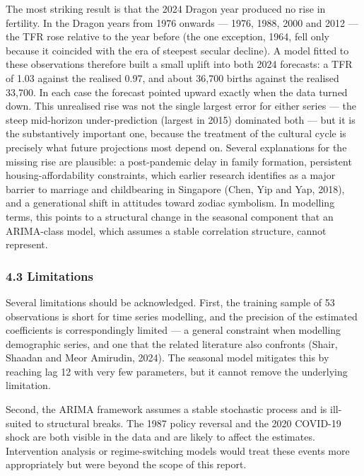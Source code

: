 \documentclass[
  11pt,
]{article}
\begin{document}
The most striking result is that the 2024 Dragon year produced no rise
in fertility. In the Dragon years from 1976 onwards --- 1976, 1988, 2000
and 2012 --- the TFR rose relative to the year before (the one
exception, 1964, fell only because it coincided with the era of steepest
secular decline). A model fitted to these observations therefore built a
small uplift into both 2024 forecasts: a TFR of 1.03 against the
realised 0.97, and about 36,700 births against the realised 33,700. In
each case the forecast pointed upward exactly when the data turned down.
This unrealised rise was not the single largest error for either series
--- the steep mid-horizon under-prediction (largest in 2015) dominated
both --- but it is the substantively important one, because the
treatment of the cultural cycle is precisely what future projections
most depend on. Several explanations for the missing rise are plausible:
a post-pandemic delay in family formation, persistent
housing-affordability constraints, which earlier research identifies as
a major barrier to marriage and childbearing in Singapore (Chen, Yip and
Yap, 2018), and a generational shift in attitudes toward zodiac
symbolism. In modelling terms, this points to a structural change in the
seasonal component that an ARIMA-class model, which assumes a stable
correlation structure, cannot represent.

\subsubsection{4.3 Limitations}\label{limitations}

Several limitations should be acknowledged. First, the training sample
of 53 observations is short for time series modelling, and the precision
of the estimated coefficients is correspondingly limited --- a general
constraint when modelling demographic series, and one that the related
literature also confronts (Shair, Shaadan and Meor Amirudin, 2024). The
seasonal model mitigates this by reaching lag 12 with very few
parameters, but it cannot remove the underlying limitation.

Second, the ARIMA framework assumes a stable stochastic process and is
ill-suited to structural breaks. The 1987 policy reversal and the 2020
COVID-19 shock are both visible in the data and are likely to affect the
estimates. Intervention analysis or regime-switching models would treat
these events more appropriately but were beyond the scope of this
report.
\end{document}

